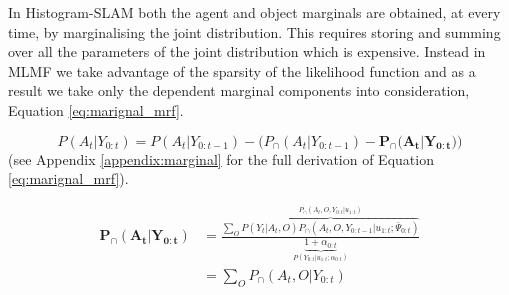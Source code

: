 In Histogram-SLAM both the agent and object marginals are obtained, at every time, by marginalising the joint distribution.
This requires storing and summing over all the parameters of the joint distribution which is expensive.
Instead in MLMF we take advantage of the sparsity of the likelihood function and as a result we take only the dependent marginal components into consideration, 
Equation \ref{eq:marignal_mrf}. 

\begin{equation}
 P(A_t|Y_{0:t})  =  P(A_t|Y_{0:t-1}) - \Big(P_{\cap}(A_t|Y_{0:t-1}) -  \mathbf{P_{\cap}(A_t|Y_{0:t}})  \Big) \label{eq:marignal_mrf} 
\end{equation}
(see Appendix \ref{appendix:marginal} for the full derivation of Equation \ref{eq:marignal_mrf}).

\begin{align}\label{eq:marignal_mrf_2}
 \mathbf{P_{\cap}(A_t|Y_{0:t})} &= \frac{ \sum\limits_{O} \overbrace{ P(Y_t|A_{t},O) P_{\cap}(A_t,O,Y_{0:t-1}|u_{1:t};\bar{\Psi}_{0:t})  }^{P_{\cap}(A_t,O,Y_{0:t}|u_{1:t})}}{\underbrace{1  + \alpha_{0:t}}_{P(Y_{0:t}|u_{1:t};\alpha_{0:t})}} \\
		       &= \sum\limits_{O} P_{\cap}(A_t,O|Y_{0:t})
\end{align}

